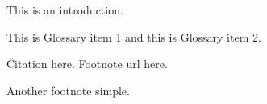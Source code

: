 
This is an introduction.

This is \gls{Glossary item 1} and this is \gls{Glossary item 2}.

Citation here\cite{Li2019}. Footnote url here.

Another footnote simple.
